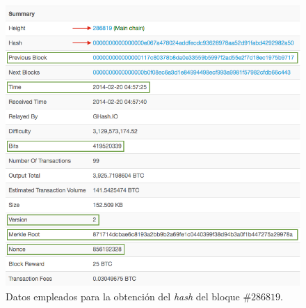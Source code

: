 \documentclass{article}
\begin{document}
    \begin{figure}[H]
    \centering
        \includegraphics[scale=0.47]{img/Bitcoin_block_SHA_256_Block_Data}
        \caption{Datos empleados para la obtención del \textit{hash} del bloque \#$286819$.}
    \end{figure}
    
    \vspace{3mm}
\end{document}
